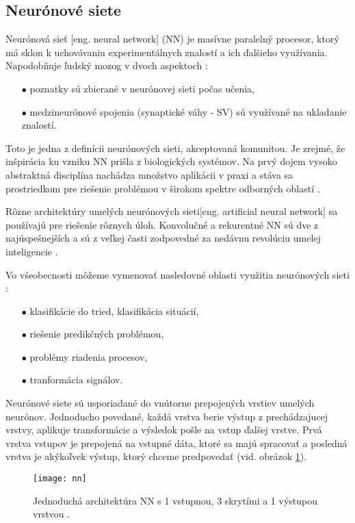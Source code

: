 \subsection{Neurónové siete}
\label{subsec:neuralnetworks}
Neurónová sieť [eng. neural network] (NN) je masívne paralelný procesor, ktorý má sklon k uchovávaniu experimentálnych znalostí a ich ďalšieho využívania.
Napodobňuje ľudský mozog v dvoch aspektoch \cite{odkaz:NNIntroduction}:
\begin{enumerate}
	\item[$\bullet$] poznatky sú zbierané v neurónovej sieti počas učenia,
	\item[$\bullet$] medzineurónové spojenia (synaptické váhy - SV) sú využívané na ukladanie znalostí.
\end{enumerate}
Toto je jedna z definícii neurónových sieti, akceptovaná komunitou.
Je zrejmé, že inšpirácia ku vzniku NN prišla z biologických systémov.
Na prvý dojem vysoko abstraktná disciplína nachádza množstvo aplikácii v praxi a stáva sa prostriedkom pre riešenie problémou v širokom spektre odborných oblastí \cite{odkaz:NNIntroduction}.

Rôzne architektúry umelých neurónových sieti[eng. artificial neural network] sa používajú pre riešenie rôznych úloh.
Konvolučné a rekurentné NN sú dve z najúspešnejších a sú z veľkej časti zodpovedné za nedávnu revolúciu umelej inteligencie \cite{odkaz:CorrectionOfImageOrentation}.

Vo všeobecnosti môžeme vymenovať nasledovné oblasti využitia neurónových sieti \cite{odkaz:NNIntroduction}:
\begin{enumerate}
    \item[$\bullet$] klasifikácie do tried, klasifikácia situácií,
    \item[$\bullet$] riešenie predikčných problémou,
    \item[$\bullet$] problémy riadenia procesov,
    \item[$\bullet$] tranformácia signálov.
\end{enumerate}

Neurónové siete sú usporiadané do vnútorne prepojených vrstiev umelých neurónov.
Jednoducho povedané, každá vrstva berie výstup z prechádzajucej vrstvy, aplikuje transformácie a výsledok pošle na vstup ďalšej vrstve.
Prvá vrstva vstupov je prepojená na vstupné dáta, ktoré sa majú spracovať a posledná vrstva je akýkoľvek výstup, ktorý chceme predpovedať \cite{odkaz:CorrectionOfImageOrentation} (vid. obrázok \ref{pic:NNExample}).
\begin{figure}[H]
	\centering
	\texttt{[image: nn]}
	\caption{Jednoduchá architektúra NN s 1 vstupnou, 3 skrytími a 1 výstupou vrstvou \cite{odkaz:CorrectionOfImageOrentation}.}
	\label{pic:NNExample}
\end{figure}

